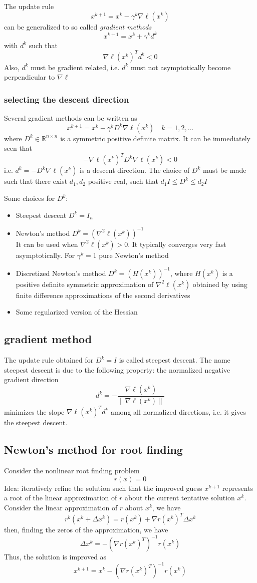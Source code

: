 \documentclass[openany]{book}
\newcommand{\R}{\mathbb{R}} %
\theoremstyle{definition}
\theoremstyle{remark}
\begin{document}
The update rule 
\[
    x^{k+1}=x^k-\gamma^k\nabla\ell(x^k)
\]
can be generalized to so called \emph{gradient methods}
\[
    x^{k+1}=x^k+\gamma^kd^k
\]
with $d^k$ such that
\[
    \nabla\ell(x^k)^Td^k<0
\]
Also, $d^k$ must be gradient related, i.e. $d^k$ must not asymptotically become perpendicular to $\nabla\ell$
\subsubsection{selecting the descent direction}
Several gradient methods can be written as 
\[
    x^{k+1} = x^k-\gamma^kD^k\nabla\ell(x^k) \quad k=1,2,\dots
\]
where $D^k\in\R^{n\times n}$ is  a symmetric positive definite matrix. It can be immediately seen that 
\[
    -\nabla\ell(x^k)^TD^k\nabla\ell(x^k)<0
\]
i.e. $d^k = -D^k\nabla\ell(x^k)$ is a descent direction. The choice of $D^k$ must be made such that there exist $d_1,d_2$ positive real, such that $d_1 I \leq D^k \leq d_2 I$

Some choices for $D^k$:
\begin{itemize}
    \item Steepest descent $D^k=I_n$
    \item Newton's method $D^k = (\nabla^2\ell(x^k))^{-1}$\\
        It can be used when $\nabla^2\ell(x^k)>0$. It typically converges very fast asymptotically. For $\gamma^k = 1$ pure Newton's method
    \item Discretized Newton's method $D^k=(H(x^k))^{-1}$, where $H(x^k)$ is a positive definite symmetric approximation of $\nabla^2\ell(x^k)$ obtained by using finite difference approximations of the second derivatives 
    \item Some regularized version of the Hessian
\end{itemize}
\subsection{gradient method}
The update rule obtained for $D^k=I$ is called steepest descent. The name steepest descent is due to the following property: the normalized negative gradient direction 
\[
    d^k = -\displaystyle\frac{\nabla\ell(x^k)}{\|\nabla\ell(x^k)\|}
\]
minimizes the slope $\nabla \ell(x^k)^Td^k$ among all normalized directions, i.e. it gives the steepest descent.

\subsection{Newton's method for root finding}
Consider the nonlinear root finding problem 
\[
    r(x) = 0
\]
Idea: iteratively refine the solution such that the improved guess $x^{k+1}$ represents a root of the linear approximation of $r$ about the current tentative solution $x^k$. Consider the linear approximation of $r$ about $x^k$, we have 
\[
    r^k(x^k+\Delta x^k) = r(x^k)+\nabla r(x^k)^T\Delta x^k
\]
then, finding the zeros of the approximation, we have
\[
    \Delta x^k = -(\nabla r(x^k)^T)^{-1}r(x^k)
\]
Thus, the solution is improved as 
\[
    x^{k+1} = x^k-(\nabla r(x^k)^T)^{-1}r(x^k)
\]
\end{document}
